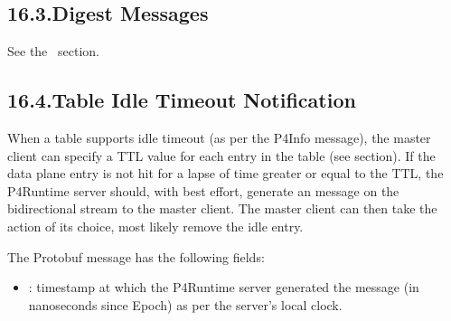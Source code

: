 \documentclass[11pt]{article}
\begin{document}
{%
\subsection{16.3.\hspace*{0.5em}Digest Messages}\label{sec-digest-messages}%

\noindent{}See the~ section.%

\subsection{16.4.\hspace*{0.5em}Table Idle Timeout Notification}\label{sec-table-idle-timeout-notification}%

\noindent{}When a table supports idle timeout (as per the P4Info message), the master
client can specify a TTL value for each entry in the table (see
 section). If the data plane entry is not hit
for a lapse of time greater or equal to the TTL, the P4Runtime server should,
with best effort, generate an  message on the
 bidirectional stream to the master client. The master client can
then take the action of its choice, most likely remove the idle entry.%

The  Protobuf message has the following fields:%

\begin{itemize}%

\item{}
: timestamp at which the P4Runtime server generated the message (in
nanoseconds since Epoch) as per the server's local clock.%


\end{itemize}}
\end{document}
